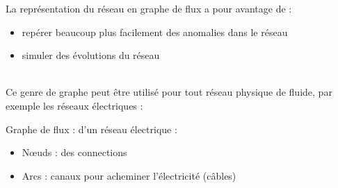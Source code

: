 	\begin{frame}
		La représentation du réseau en graphe de flux a pour avantage de : 
		\begin{itemize}
		\pause
		\item repérer beaucoup plus facilement des anomalies dans le réseau
		\pause
		\item simuler des évolutions du réseau
		\end{itemize}
		~\\
		\pause
		Ce genre de graphe peut être utilisé pour tout réseau physique de fluide, par exemple les réseaux électriques :
		\pause
		\begin{exampleblock}{Graphe de flux : d'un réseau électrique :}
		\begin{itemize}
		\item Nœuds : des connections
		\item Arcs : canaux pour acheminer l'électricité (câbles)
		\end{itemize}
		\end{exampleblock}
	\end{frame}	
	
